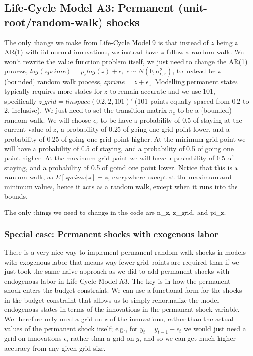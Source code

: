 \subsection{Life-Cycle Model A3: Permanent (unit-root/random-walk) shocks}
The only change we make from Life-Cycle Model 9 is that instead of $z$ being a AR(1) with iid normal innovations, we instead have $z$ follow a random-walk. We won't rewrite the value function problem itself, we just need to change the AR(1) process, $log(zprime)=\rho_z log(z) + \epsilon, \; \epsilon \sim N(0,\sigma_{\epsilon,z}^2)$, to instead be a (bounded) random walk process, $zprime=z+\epsilon_z$. Modelling permanent states typically requires more states for $z$ to remain accurate and we use 101, specifically $z\_{}grid=linspace(0.2,2,101)'$ (101 points equally spaced from 0.2 to 2, inclusive). We just need to set the transition matrix $\pi_z$ to be a (bounded) random walk. We will choose $\epsilon_z$ to be have a probability of 0.5 of staying at the current value of $z$, a probability of 0.25 of going one grid point lower, and a probability of 0.25 of going one grid point higher. At the minimum grid point we will have a probability of 0.5 of staying, and a probability of 0.5 of going one point higher. At the maximum grid point we will have a probability of 0.5 of staying, and a probability of 0.5 of goind one point lower. Notice that this is a random walk, as $E[zprime|z]=z$, everywhere except at the maximum and minimum values, hence it acts as a random walk, except when it runs into the bounds.

The only things we need to change in the code are n\_{}z, z\_{}grid, and pi\_z.

\subsubsection{Special case: Permanent shocks with exogenous labor}
There is a very nice way to implement permanent random walk shocks in models with exogenous labor that means way fewer grid points are required than if we just took the same naive approach as we did to add permanent shocks with endogenous labor in Life-Cycle Model A3. The key is in how the permanent shock enters the budget constraint. We can use a functional form for the shocks in the budget constraint that allows us to simply renormalize the model endogenous states in terms of the innovations in the permanent shock variable. We therefore only need a grid on $z$ of the innovations, rather than the actual values of the permanent shock itself; e.g., for $y_t=y_{t-1}+\epsilon_t$ we would just need a grid on innovations $\epsilon$, rather than a grid on $y$, and so we can get much higher accuracy from any given grid size.


